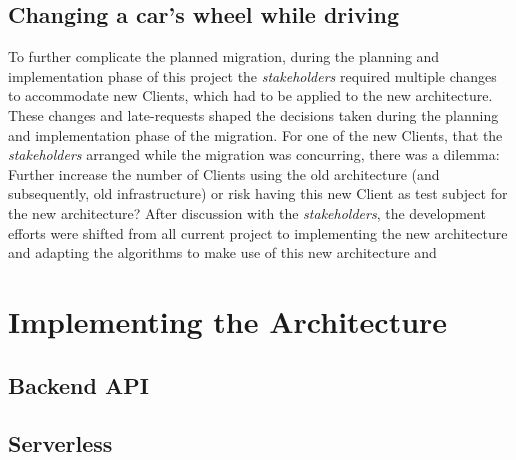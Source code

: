 \subsection{Changing a car's wheel while driving}\label{methodology:s:changing-a-cars-wheel-while-driving}
To further complicate the planned migration, during the planning and implementation phase of this project the \textit{stakeholders} required multiple changes to accommodate new Clients, which had to be applied to the new architecture. These changes and late-requests shaped the decisions taken during the planning and implementation phase of the migration. For one of the new Clients, that the \textit{stakeholders} arranged while the migration was concurring, there was a dilemma: Further increase the number of Clients using the old architecture (and subsequently, old infrastructure) or risk having this new Client as test subject for the new architecture? After discussion with the \textit{stakeholders}, the development efforts were shifted from all current project to implementing the new architecture and adapting the algorithms to make use of this new architecture and 



\section{Implementing the Architecture}\label{methodology:s:implementing-the-architecture}
\subsection{Backend API}\label{methodology:ss:backendapi}
\subsection{Serverless}\label{methodology:ss:serverless}





